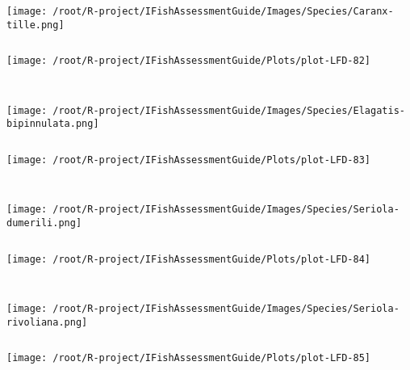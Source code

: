 \documentclass{report}\usepackage[]{graphicx}\usepackage[]{color}
\makeatletter
\def\maxwidth{ %
  \ifdim\Gin@nat@width>\linewidth
    \linewidth
  \else
    \Gin@nat@width
  \fi
}
\newenvironment{kframe}{%
 \def\at@end@of@kframe{}%
 \ifinner\ifhmode%
  \def\at@end@of@kframe{\end{minipage}}%
  \begin{minipage}{\columnwidth}%
 \fi\fi%
 \def\FrameCommand##1{\hskip\@totalleftmargin \hskip-\fboxsep
 \colorbox{shadecolor}{##1}\hskip-\fboxsep
     \hskip-\linewidth \hskip-\@totalleftmargin \hskip\columnwidth}%
 \MakeFramed {\advance\hsize-\width
   \@totalleftmargin\z@ \linewidth\hsize
   \@setminipage}}%
 {\par\unskip\endMakeFramed%
 \at@end@of@kframe}
\newenvironment{knitrout}{}{} %
\makeatother
\begin{document}
\begin{knitrout}
\begin{kframe}
\begin{verbatim}
\end{verbatim}
\end{kframe}
\texttt{[image: /root/R-project/IFishAssessmentGuide/Images/Species/Caranx-tille.png]}
\begin{kframe}\begin{verbatim}
\end{verbatim}
\end{kframe}
\texttt{[image: /root/R-project/IFishAssessmentGuide/Plots/plot-LFD-82]} 
\begin{kframe}\begin{verbatim}
 
\end{verbatim}
\end{kframe}
\texttt{[image: /root/R-project/IFishAssessmentGuide/Images/Species/Elagatis-bipinnulata.png]}
\begin{kframe}\begin{verbatim}
\end{verbatim}
\end{kframe}
\texttt{[image: /root/R-project/IFishAssessmentGuide/Plots/plot-LFD-83]} 
\begin{kframe}\begin{verbatim}
 
\end{verbatim}
\end{kframe}
\texttt{[image: /root/R-project/IFishAssessmentGuide/Images/Species/Seriola-dumerili.png]}
\begin{kframe}\begin{verbatim}
\end{verbatim}
\end{kframe}
\texttt{[image: /root/R-project/IFishAssessmentGuide/Plots/plot-LFD-84]} 
\begin{kframe}\begin{verbatim}
 
\end{verbatim}
\end{kframe}
\texttt{[image: /root/R-project/IFishAssessmentGuide/Images/Species/Seriola-rivoliana.png]}
\begin{kframe}\begin{verbatim}
\end{verbatim}
\end{kframe}
\texttt{[image: /root/R-project/IFishAssessmentGuide/Plots/plot-LFD-85]} 
\begin{kframe}\begin{verbatim}
 

\end{verbatim}
\end{kframe}
\end{knitrout}
\end{document}
